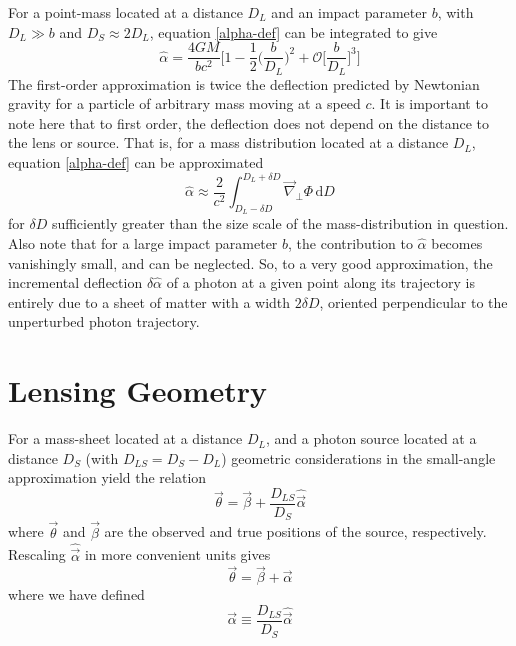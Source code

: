 \documentclass[12pt,preprint]{aastex}			%
\newcommand{\dd}{\mathrm{d}} %
\begin{document}
For a point-mass located at a distance $D_L$ and an impact parameter $b$, with $D_L \gg b$ and $D_S \approx 2D_L$, equation \ref{alpha-def} can be integrated to give
\begin{equation}
  \hat{\alpha} = \frac{4GM}{bc^2}\Bigg[1 - \frac{1}{2}\bigg(\frac{b}{D_L}\bigg)^2 + \mathcal{O}\bigg[\frac{b}{D_L}\bigg]^3 \Bigg]
\end{equation}
The first-order approximation is twice the deflection predicted by Newtonian gravity for a particle of arbitrary mass moving at a speed $c$.  It is important to note here that to first order, the deflection does not depend on the distance to the lens or source.  That is, for a mass distribution located at a distance $D_L$, equation \ref{alpha-def} can be approximated
\begin{equation}
  \label{alpha-def-approx}
  \hat{\alpha} \approx \frac{2}{c^2}\int_{D_L-\delta D}^{D_L+\delta D} \vec{\nabla}_\perp\Phi\,\dd D
\end{equation}
for $\delta D$ sufficiently greater than the size scale of the mass-distribution in question.  Also note that for a large impact parameter $b$, the contribution to $\hat{\alpha}$ becomes vanishingly small, and can be neglected.  So, to a very good approximation, the incremental deflection $\delta \hat{\alpha}$ of a photon at a given point along its trajectory is entirely due to a sheet of matter with a width $2\delta D$, oriented perpendicular to the unperturbed photon trajectory.  

\section{Lensing Geometry}
For a mass-sheet located at a distance $D_L$, and a photon source located at a distance $D_S$ (with $D_{LS} = D_S - D_L$) geometric considerations in the small-angle approximation yield the relation
\begin{equation}
  \vec{\theta} = \vec{\beta} + \frac{D_{LS}}{D_S}\hat{\vec{\alpha}}
\end{equation}
where $\vec{\theta}$ and $\vec{\beta}$ are the observed and true positions of the source, respectively.  Rescaling $\hat{\vec{\alpha}}$ in more convenient units gives
\begin{equation}
  \label{mapping}
  \vec{\theta} = \vec{\beta} + \vec{\alpha}
\end{equation}
where we have defined
\begin{equation}
  \label{alpha-def2}
  \vec{\alpha} \equiv \frac{D_{LS}}{D_S}\hat{\vec{\alpha}}
\end{equation}
\end{document}
